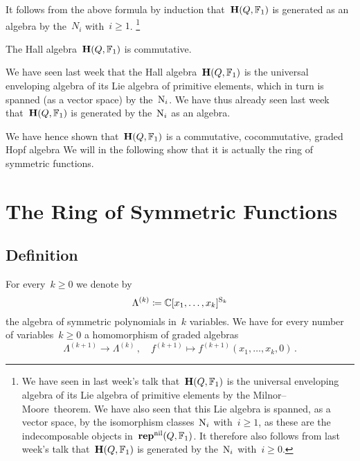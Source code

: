 \documentclass[a4paper,11pt]{scrartcl}
\begin{document}
\begin{example}
\begin{enumerate}
      It follows from the above formula by induction that~$\mathbf{H}(Q, \mathbb{F}_1)$ is generated as an algebra by the~$N_i$ with~$i \geq 1$.%
      \footnote{%
        We have seen in last week’s talk that~$\mathbf{H}(Q, \mathbb{F}_1)$ is the universal enveloping algebra of its Lie algebra of primitive elements by the Milnor--Moore~theorem.
        We have also seen that this Lie algebra is spanned, as a vector space, by the isomorphism classes~$\mathrm{N}_i$ with~$i \geq 1$, as these are the indecomposable objects in~$\mathbf{rep}^{\mathrm{nil}}(Q, \mathbb{F}_1)$.
        It therefore also follows from last week’s talk that~$\mathbf{H}(Q, \mathbb{F}_1)$ is generated by the~$\mathrm{N}_i$ with~$i \geq 0$.
      }
  \end{enumerate}
\end{example}

\begin{corollary}
  The Hall algebra~$\mathbf{H}(Q, \mathbb{F}_1)$ is commutative.
\end{corollary}

\begin{remark}
  We have seen last week that the Hall algebra~$\mathbf{H}(Q, \mathbb{F}_1)$ is the universal enveloping algebra of its Lie algebra of primitive elements, which in turn is spanned (as a vector space) by the~$\mathrm{N}_i$.
  We have thus already seen last week that~$\mathbf{H}(Q, \mathbb{F}_1)$ is generated by the~$\mathrm{N}_i$ as an algebra.
\end{remark}

We have hence shown that~$\mathbf{H}(Q, \mathbb{F}_1)$ is a commutative, cocommutative, graded Hopf algebra
We will in the following show that it is actually the ring of symmetric functions.





\section{The Ring of Symmetric Functions}



\subsection{Definition}

For every~$k \geq 0$ we denote by
\[
  \Lambda^{(k)}
  \coloneqq
  \mathbb{C}[x_1, \dotsc, x_k]^{\mathrm{S}_k}
\]
the algebra of symmetric polynomials in~$k$ variables.
We have for every number of variables~$k \geq 0$ a homomorphism of graded algebras
\[
  \Lambda^{(k+1)} \to \Lambda^{(k)} \,,
  \quad
  f^{(k+1)}
  \mapsto
  f^{(k+1)}(x_1, \dotsc, x_k, 0) \,.
\]
\end{document}
